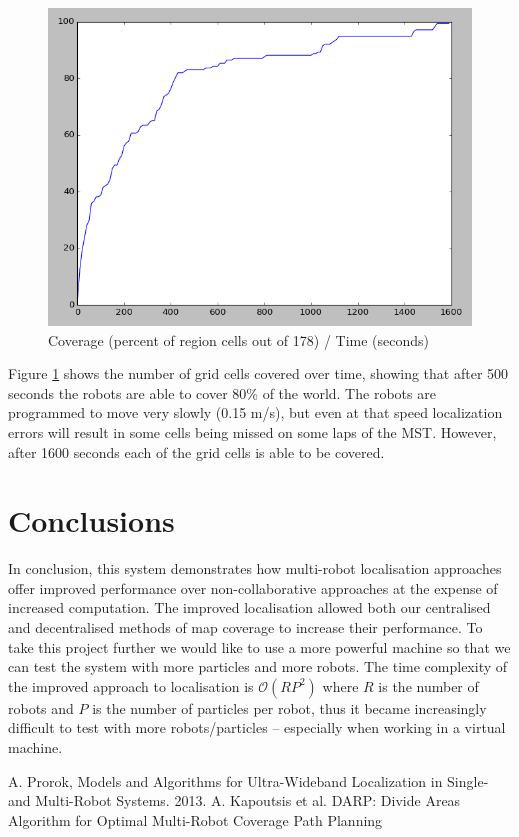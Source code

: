 \documentclass[a4paper, 10pt, conference]{ieeeconf}      %
\begin{document}
\begin{figure}
	\includegraphics[width=\columnwidth]{dec_t2_line_percent.png}
	\caption{Coverage (percent of region cells out of 178) / Time (seconds)}
    \label{fig:decLine}
\end{figure}

Figure \ref{fig:decLine} shows the number of grid cells covered over time, showing that after 500 seconds the robots are able to cover 80\% of the world. The robots are programmed to move very slowly (0.15 m/s), but even at that speed localization errors will result in some cells being missed on some laps of the MST. However, after 1600 seconds each of the grid cells is able to be covered.

\section{Conclusions}
In conclusion, this system demonstrates how multi-robot localisation approaches offer improved performance over non-collaborative approaches at the expense of increased computation. The improved localisation allowed both our centralised and decentralised methods of map coverage to increase their performance. To take this project further we would like to use a more powerful machine so that we can test the system with more particles and more robots. The time complexity of the improved approach to localisation is $\mathcal{O}(RP^2)$ where $R$ is the number of robots and $P$ is the number of particles per robot, thus it became increasingly difficult to test with more robots/particles -- especially when working in a virtual machine.

\begin{thebibliography}{9}
 A. Prorok, Models and Algorithms for Ultra-Wideband Localization in Single- and Multi-Robot Systems. 2013.
 A. Kapoutsis et al. DARP: Divide Areas Algorithm for Optimal Multi-Robot Coverage Path Planning
\end{thebibliography}
\end{document}
